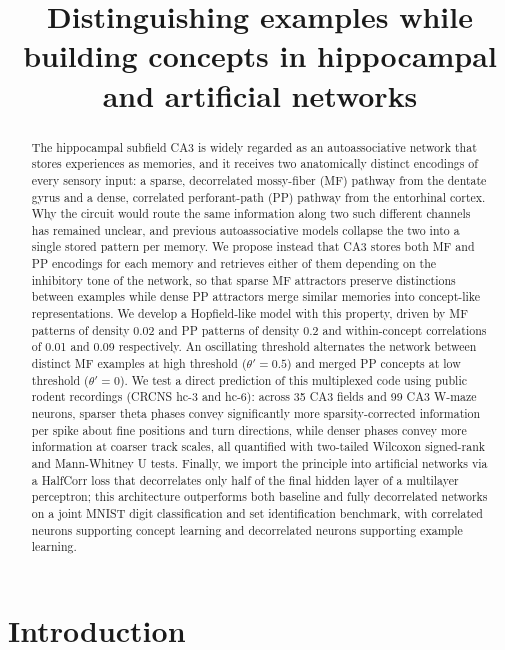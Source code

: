 \documentclass[11pt]{article}
\title{Distinguishing examples while building concepts in hippocampal and artificial networks}
\author{}
\date{}
\begin{document}
\maketitle

\begin{abstract}
The hippocampal subfield CA3 is widely regarded as an autoassociative network
that stores experiences as memories, and it receives two anatomically distinct
encodings of every sensory input: a sparse, decorrelated mossy-fiber (MF)
pathway from the dentate gyrus and a dense, correlated perforant-path (PP)
pathway from the entorhinal cortex. Why the circuit would route the same
information along two such different channels has remained unclear, and
previous autoassociative models collapse the two into a single stored pattern
per memory. We propose instead that CA3 stores both MF and PP encodings for
each memory and retrieves either of them depending on the inhibitory tone of
the network, so that sparse MF attractors preserve distinctions between
examples while dense PP attractors merge similar memories into concept-like
representations. We develop a Hopfield-like model with this property, driven
by MF patterns of density 0.02 and PP patterns of density 0.2 and
within-concept correlations of 0.01 and 0.09 respectively. An oscillating
threshold alternates the network between distinct MF examples at high
threshold ($\theta' = 0.5$) and merged PP concepts at low threshold
($\theta' = 0$). We test a direct prediction of this multiplexed code using
public rodent recordings (CRCNS hc-3 and hc-6): across 35 CA3 fields and 99
CA3 W-maze neurons, sparser theta phases convey significantly more
sparsity-corrected information per spike about fine positions and turn
directions, while denser phases convey more information at coarser track
scales, all quantified with two-tailed Wilcoxon signed-rank and Mann-Whitney
U tests. Finally, we import the principle into artificial networks via a
HalfCorr loss that decorrelates only half of the final hidden layer of a
multilayer perceptron; this architecture outperforms both baseline and
fully decorrelated networks on a joint MNIST digit classification and set
identification benchmark, with correlated neurons supporting concept
learning and decorrelated neurons supporting example learning.
\end{abstract}

\section{Introduction}
\end{document}
